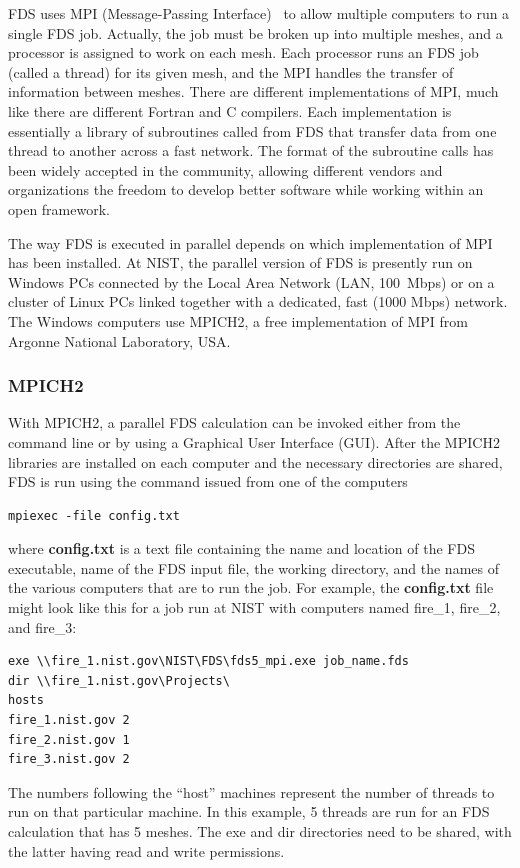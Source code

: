 \documentclass[11pt]{book}
\begin{document}
FDS uses MPI (Message-Passing Interface)~\cite{Gropp:1} to allow
multiple computers to run a single FDS job. Actually, the job must be
broken up into multiple meshes, and a processor is assigned to work on
each mesh. Each processor runs an FDS job (called a thread) for its
given mesh, and the MPI handles the transfer of information between
meshes.  There are different implementations of MPI, much like there
are different Fortran and C compilers. Each implementation is
essentially a library of subroutines called from FDS that transfer
data from one thread to another across a fast network. The format of
the subroutine calls has been widely accepted in the community,
allowing different vendors and organizations the freedom to develop
better software while working within an open framework.

The way FDS is executed in parallel depends on which implementation of
MPI has been installed.  At NIST, the parallel version of FDS is
presently run on Windows PCs connected by the Local Area Network (LAN,
100~Mbps) or on a cluster of Linux PCs linked together with a
dedicated, fast (1000 Mbps) network.  The Windows computers use
MPICH2, a free implementation of MPI from Argonne National Laboratory,
USA.

\subsubsection{MPICH2}

With MPICH2, a parallel FDS calculation can be invoked either
from the command line or by using a Graphical User Interface
(GUI). After the MPICH2 libraries are installed on each computer and
the necessary directories are shared, FDS is run using the command
issued from one of the computers
\begin{verbatim}
mpiexec -file config.txt
\end{verbatim}
where {\bf config.txt} is a text file containing the name and location
of the FDS executable, name of the FDS input file, the working directory,
and the names of the various computers that are to run the job. For
example, the {\bf config.txt} file might look like this for a job run at NIST with computers named
fire\_1, fire\_2, and fire\_3:
\begin{verbatim}
exe \\fire_1.nist.gov\NIST\FDS\fds5_mpi.exe job_name.fds
dir \\fire_1.nist.gov\Projects\
hosts
fire_1.nist.gov 2
fire_2.nist.gov 1
fire_3.nist.gov 2
\end{verbatim}
The numbers following the ``host'' machines represent the number of threads to run on that particular machine. In this
example, 5 threads are run for an FDS calculation that has 5 meshes. The {\ct exe} and {\ct dir} directories need to be shared, with the
latter having read and write permissions.
\end{document}

